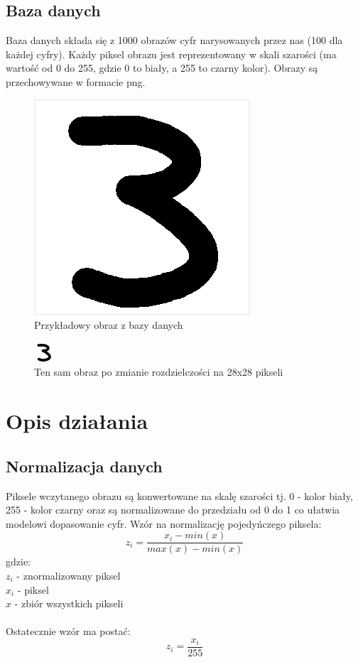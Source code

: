 \documentclass[12pt,a4paper]{article}
\begin{document}
\subsection{Baza danych}
Baza danych składa się z 1000 obrazów cyfr narysowanych przez nas (100 dla każdej cyfry). Każdy piksel obrazu jest reprezentowany w skali
szarości (ma wartość od 0 do 255, gdzie 0 to biały, a 255 to czarny kolor). Obrazy są przechowywane w formacie png.
\newpage
\begin{figure}[!h]
	\includegraphics[scale=0.8]{"number_example.png"}
	\centering
	\caption{Przykładowy obraz z bazy danych}
\end{figure}
\begin{figure}[!h]
	\includegraphics[scale=8]{"normalized.png"}
	\centering
	\caption{Ten sam obraz po zmianie rozdzielczości na 28x28 pikseli}
\end{figure}
\newpage
\section{Opis działania}
\subsection{Normalizacja danych}
Piksele wczytanego obrazu są konwertowane na skalę szarości tj. 0 - kolor biały, 255 - kolor czarny
oraz są normalizowane do przedziału od 0 do 1 co ułatwia modelowi dopasowanie cyfr.
Wzór na normalizację pojedyńczego piksela:
\[
	z_i=\frac{x_i - min(x)}{max(x) - min(x)}
\]
gdzie: \\
\indent $z_i$ - znormalizowany piksel\\
\indent $x_i$ - piksel\\
\indent $x$ - zbiór wszystkich pikseli\\~\\
Ostatecznie wzór ma postać:
\[
	z_i=\frac{x_i}{255}
\]
\end{document}
